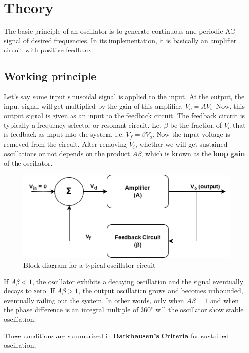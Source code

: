 \section{Theory}

The basic principle of an oscillator is to generate continuous and periodic AC signal of desired frequencies. In its implementation, it is basically an amplifier circuit with positive feedback.

\subsection*{Working principle}

Let's say some input sinusoidal signal is applied to the input. At the output, the input signal will get multiplied by the gain of this amplifier, $V_o = AV_i$. Now, this output signal is given as an input to the feedback circuit. The feedback circuit is typically a frequency selector or resonant circuit. Let $\beta$ be the fraction of $V_o$ that is feedback as input into the system, i.e. $V_f = \beta V_o$. Now the input voltage is removed from the circuit. After removing $V_i$, whether we will get sustained oscillations or not depends on the product $A\beta$, which is known as the \textbf{loop gain} of the oscillator.

\begin{figure}[H]
    \centering
    \includegraphics[width=0.85\columnwidth]{images/block.png}
    \caption{Block diagram for a typical oscillator circuit}
    \label{block}
\end{figure}

If $A\beta<1$, the oscillator exhibits a decaying oscillation and the signal eventually decays to zero. If $A\beta>1$, the output oscillation grows and becomes unbounded, eventually railing out the system. In other words, only when $A\beta=1$ and when the phase difference is an integral multiple of $360^{\circ}$ will the oscillator show stable oscillation.

These conditions are summarized in \textbf{Barkhausen's Criteria} for sustained oscillation,

